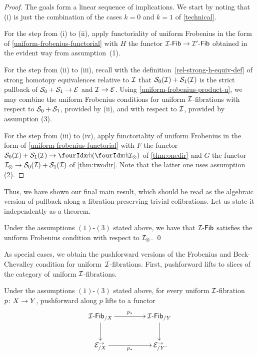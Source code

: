 \documentclass[reqno,10pt,a4paper,oneside,draft]{amsart}
\begin{document}
\begin{proof}
The goals form a linear sequence of implications.
We start by noting that (i) is just the combination of the cases $k = 0$ and $k = 1$ of \cref{technical}.

For the step from (i) to (ii), apply functoriality of uniform Frobenius in the form of \cref{uniform-frobenius-functorial} with $H$ the functor $\Fib{\cal{I}} \to \Fib{\cal{I}'}$ obtained in the evident way from assumption~(1).

For the step from (ii) to (iii), recall with the definition~\eqref{rel-strong-h-equiv-def} of strong homotopy equivalences relative to $\cal{I}$ that $\cal{S}_0(\cal{I}) + \cal{S}_1(\cal{I})$ is the strict pullback of $\cal{S}_0 + \cal{S}_1 \to \cal{E}$ and $\cal{I} \to \cal{E}$.
Using \cref{uniform-frobenius-product-u}, we may combine the uniform Frobenius conditions for uniform $\cal{I}$-fibrations with respect to $\cal{S}_0 + \cal{S}_1$, provided by (ii), and with respect to $\cal{I}$, provided by assumption (3).

For the step from (iii) to (iv), apply functoriality of uniform Frobenius in the form of \cref{uniform-frobenius-functorial} with $F$ the functor $\cal{S}_0(\cal{I}) + \cal{S}_1(\cal{I}) \to \liftl{(\liftr{\cal{I}_\otimes})}$ of \cref{thm:onedir} and $G$ the functor $\cal{I}_\otimes \to \cal{S}_0(\cal{I}) + \cal{S}_1(\cal{I})$ of \cref{thm:twodir}.
Note that the latter one uses assumption (2).
\end{proof}

Thus, we have shown our final main result, which should be read as the algebraic version of pullback along a fibration preserving trivial cofibrations.
Let us state it independently as a theorem.

\begin{theorem} \label{uniform-fibrations-uniform-frobenius}
Under the assumptions $(1)$-$(3)$ stated above, we have that $\Fib{\cal{I}} $ satisfies the uniform Frobenius condition with respect to $\cal{I}_{\otimes}$.
\qed
\end{theorem}

As special cases, we obtain the pushforward versions of the Frobenius and Beck-Chevalley condition for uniform~$\cal{I}$-fibrations.
First, pushforward lifts to slices of the category of uniform $\cal{I}$-fibrations.

\begin{corollary} \label{uniform-fibrations-frobenius-pushforward}
Under the assumptions $(1)$-$(3)$ stated above,  for every uniform $\cal{I}$-fibration
$p \co X \to Y$, pushforward along $p$ lifts to a functor
\[
\xymatrix@C+2em{
  \Fib{\cal{I}}_{/X}
  \ar[r]^{p_*}
  \ar[d]
&
  \Fib{\cal{I}}_{/Y}
  \ar[d]
\\
  \catE_{/X}^\to
  \ar[r]_{p_*}
&
  \catE_{/Y}^\to
\rlap{.}}
\]
\end{corollary}
\end{document}

